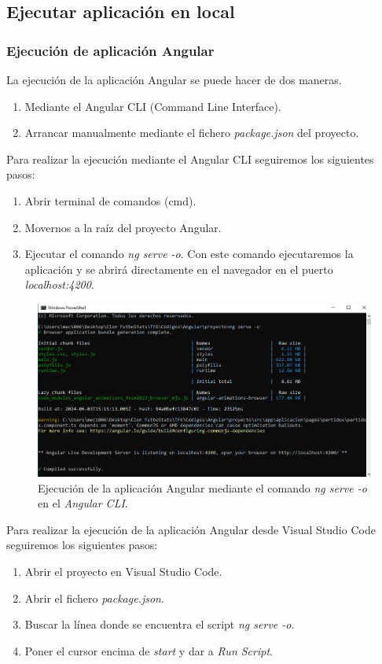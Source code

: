 \subsection{Ejecutar aplicación en local}
\subsubsection{Ejecución de aplicación Angular}
La ejecución de la aplicación Angular se puede hacer de dos maneras.
\begin{enumerate}
    \item Mediante el Angular CLI (Command Line Interface).
    \item Arrancar manualmente mediante el fichero \textit{package.json} del proyecto.
\end{enumerate}

Para realizar la ejecución mediante el Angular CLI seguiremos los siguientes pasos:
\begin{enumerate}
    \item Abrir terminal de comandos (cmd).
    \item Movernos a la raíz del proyecto Angular.
    \item Ejecutar el comando \textit{ng serve -o}. Con este comando ejecutaremos la aplicación y se abrirá directamente en el navegador en el puerto \textit{localhost:4200}.
\end{enumerate}

\begin{figure}[H]
    \centering
    \includegraphics[width=0.85\linewidth]{img/ngserveCLI.png}
    \caption{Ejecución de la aplicación Angular mediante el comando \textit{ng serve -o} en el \textit{Angular CLI}.}
    \label{fig:enter-label}
\end{figure}

Para realizar la ejecución de la aplicación Angular desde Visual Studio Code seguiremos los siguientes pasos:
\begin{enumerate}
    \item Abrir el proyecto en Visual Studio Code.
    \item Abrir el fichero \textit{package.json}.
    \item Buscar la línea donde se encuentra el script \textit{ng serve -o}.
    \item Poner el cursor encima de \textit{start} y dar a \textit{Run Script}.
\end{enumerate}

